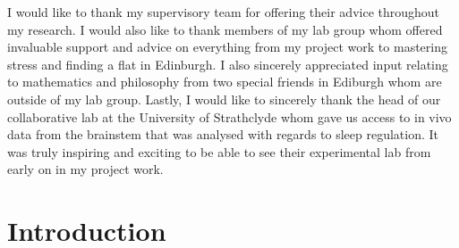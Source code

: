 \documentclass[mphil,deptreport,ianc]{infthesis} %
\begin{document}
\begin{preliminary}
I would like to thank my supervisory team for offering their advice throughout my research.
I would also like to thank members of my lab group whom offered invaluable support and advice on everything from my project work to mastering stress and finding a flat in Edinburgh.
I also sincerely appreciated input relating to mathematics and philosophy from two special friends in Ediburgh whom are outside of my lab group.
Lastly, I would like to sincerely thank the head of our collaborative lab at the University of Strathclyde whom gave us access to in vivo data from the brainstem that was analysed with regards to sleep regulation. It was truly inspiring and exciting to be able to see their experimental lab from early on in my project work.


\tableofcontents
\end{preliminary}


\chapter{Introduction}






\end{document}
